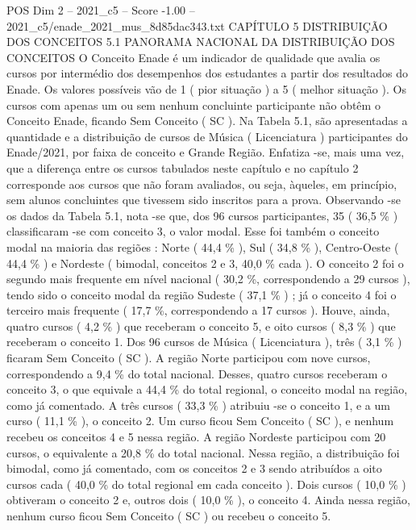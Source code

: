 \begin{textsample}{POS Dim 2 – 2021\_c5 – Score -1.00 – 2021\_c5/enade\_2021\_mus\_8d85dac343.txt}  \label{ex:f2_pos_288}
CAPÍTULO 5 DISTRIBUIÇÃO DOS CONCEITOS 5.1 PANORAMA NACIONAL DA DISTRIBUIÇÃO DOS CONCEITOS O Conceito Enade é um indicador de qualidade que avalia os cursos por intermédio dos desempenhos dos estudantes a partir dos resultados do Enade.
Os valores possíveis vão de 1 ( pior situação ) a 5 ( melhor situação ).
Os cursos com apenas um ou sem nenhum concluinte participante não obtêm o Conceito Enade, ficando Sem Conceito ( SC ).
Na Tabela 5.1, são apresentadas a quantidade e a distribuição de cursos de Música ( Licenciatura ) participantes do Enade/2021, por faixa de conceito e Grande Região.
Enfatiza -se, mais uma vez, que a diferença entre os cursos tabulados neste capítulo e no capítulo 2 corresponde aos cursos que não foram avaliados, ou seja, àqueles, em princípio, sem alunos concluintes que tivessem sido inscritos para a prova.
Observando -se os dados da Tabela 5.1, nota -se que, dos 96 cursos participantes, 35 ( 36,5 \% ) classificaram -se com conceito 3, o valor modal.
Esse foi também o conceito modal na maioria das regiões : Norte ( 44,4 \% ), Sul ( 34,8 \% ), Centro-Oeste ( 44,4 \% ) e Nordeste ( bimodal, conceitos 2 e 3, 40,0 \% cada ).
O conceito 2 foi o segundo mais frequente em nível nacional ( 30,2 \%, correspondendo a 29 cursos ), tendo sido o conceito modal da região Sudeste ( 37,1 \% ) ; já o conceito 4 foi o terceiro mais frequente ( 17,7 \%, correspondendo a 17 cursos ).
Houve, ainda, quatro cursos ( 4,2 \% ) que receberam o conceito 5, e oito cursos ( 8,3 \% ) que receberam o conceito 1.
Dos 96 cursos de Música ( Licenciatura ), três ( 3,1 \% ) ficaram Sem Conceito ( SC ).
A região Norte participou com nove cursos, correspondendo a 9,4 \% do total nacional.
Desses, quatro cursos receberam o conceito 3, o que equivale a 44,4 \% do total regional, o conceito modal na região, como já comentado.
A três cursos ( 33,3 \% ) atribuiu -se o conceito 1, e a um curso ( 11,1 \% ), o conceito 2.
Um curso ficou Sem Conceito ( SC ), e nenhum recebeu os conceitos 4 e 5 nessa região.
A região Nordeste participou com 20 cursos, o equivalente a 20,8 \% do total nacional.
Nessa região, a distribuição foi bimodal, como já comentado, com os conceitos 2 e 3 sendo atribuídos a oito cursos cada ( 40,0 \% do total regional em cada conceito ).
Dois cursos ( 10,0 \% ) obtiveram o conceito 2 e, outros dois ( 10,0 \% ), o conceito 4.
Ainda nessa região, nenhum curso ficou Sem Conceito ( SC ) ou recebeu o conceito 5.

\end{textsample}
